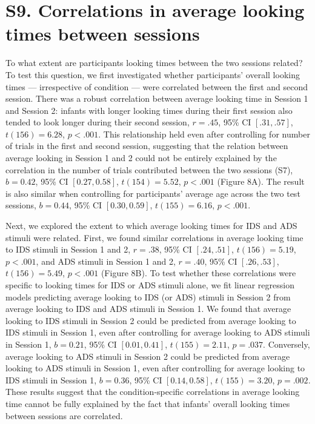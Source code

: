 \documentclass[
  man, donotrepeattitle,floatsintext]{apa6}
\begin{document}
\newpage

\hypertarget{s9.-correlations-in-average-looking-times-between-sessions}{%
\section{S9. Correlations in average looking times between sessions}\label{s9.-correlations-in-average-looking-times-between-sessions}}

To what extent are participants looking times between the two sessions related?
To test this question, we first investigated whether participants' overall looking times --- irrespective of condition --- were correlated between the first and second session.
There was a robust correlation between average looking time in Session 1 and Session 2: infants with longer looking times during their first session also tended to look longer during their second session, \(r = .45\), 95\% CI \([.31, .57]\), \(t(156) = 6.28\), \(p < .001\).
This relationship held even after controlling for number of trials in the first and second session, suggesting that the relation between average looking in Session 1 and 2 could not be entirely explained by the correlation in the number of trials contributed between the two sessions (S7), \(b = 0.42\), 95\% CI \([0.27, 0.58]\), \(t(154) = 5.52\), \(p < .001\) (Figure 8A).
The result is also similar when controlling for participants' average age across the two test sessions, \(b = 0.44\), 95\% CI \([0.30, 0.59]\), \(t(155) = 6.16\), \(p < .001\).

Next, we explored the extent to which average looking times for IDS and ADS stimuli were related.
First, we found similar correlations in average looking time to IDS stimuli in Session 1 and 2, \(r = .38\), 95\% CI \([.24, .51]\), \(t(156) = 5.19\), \(p < .001\), and ADS stimuli in Session 1 and 2, \(r = .40\), 95\% CI \([.26, .53]\), \(t(156) = 5.49\), \(p < .001\) (Figure 8B).
To test whether these correlations were specific to looking times for IDS or ADS stimuli alone, we fit linear regression models predicting average looking to IDS (or ADS) stimuli in Session 2 from average looking to IDS and ADS stimuli in Session 1.
We found that average looking to IDS stimuli in Session 2 could be predicted from average looking to IDS stimuli in Session 1, even after controlling for average looking to ADS stimuli in Session 1, \(b = 0.21\), 95\% CI \([0.01, 0.41]\), \(t(155) = 2.11\), \(p = .037\).
Conversely, average looking to ADS stimuli in Session 2 could be predicted from average looking to ADS stimuli in Session 1, even after controlling for average looking to IDS stimuli in Session 1, \(b = 0.36\), 95\% CI \([0.14, 0.58]\), \(t(155) = 3.20\), \(p = .002\).
These results suggest that the condition-specific correlations in average looking time cannot be fully explained by the fact that infants' overall looking times between sessions are correlated.
\end{document}
